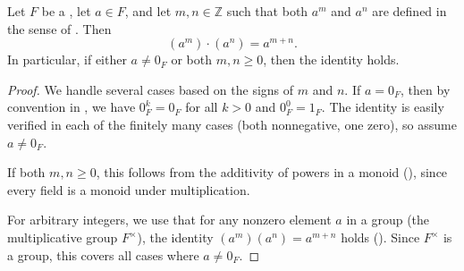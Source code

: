 \begin{lemma} \label{lemma:multiplicativity_of_powers_in_a_field}
    Let $F$ be a , let $a \in F$, and let $m,n \in \mathbb{Z}$ such that both $a^m$ and $a^n$ are defined in the sense of . Then
    $$\left(a^m\right)\cdot\left(a^n\right) = a^{m+n}.$$
    In particular, if either $a \neq 0_F$ or both $m,n \geq 0$, then the identity holds.
\end{lemma}

\begin{proof}
We handle several cases based on the signs of $m$ and $n$. If $a = 0_F$, then by convention in , we have $0_F^k = 0_F$ for all $k > 0$ and $0_F^0 = 1_F$. The identity is easily verified in each of the finitely many cases (both nonnegative, one zero), so assume $a \neq 0_F$.

If both $m,n \geq 0$, this follows from the additivity of powers in a monoid (), since every field is a monoid under multiplication.

For arbitrary integers, we use that for any nonzero element $a$ in a group (the multiplicative group $F^\times$), the identity $(a^m)(a^n) = a^{m+n}$ holds (). Since $F^\times$ is a group, this covers all cases where $a \neq 0_F$.
\end{proof}
